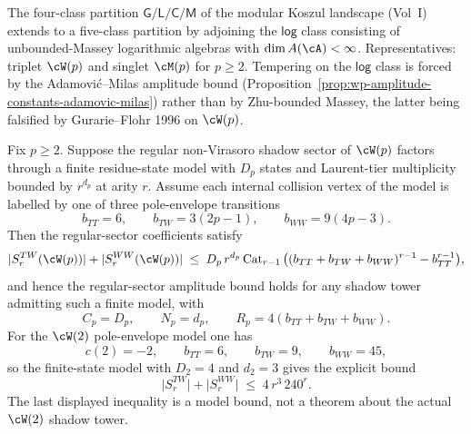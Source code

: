 \begin{corollary}
\label{cor:five-class-partition-log}
The four-class partition $\mathsf{G} / \mathsf{L} / \mathsf{C} / \mathsf{M}$
of the modular Koszul landscape (Vol~I) extends to a five-class
partition by adjoining the $\mathsf{log}$ class consisting of
unbounded-Massey logarithmic algebras with
$\dim A(\cA) < \infty$. Representatives: triplet $\cW(p)$ and
singlet $\cM(p)$ for $p \ge 2$. Tempering on the $\mathsf{log}$ class
is forced by the Adamovi\'c--Milas amplitude bound
\textup{(}Proposition~\ref{prop:wp-amplitude-constants-adamovic-milas}\textup{)}
rather than by Zhu-bounded Massey, the latter being falsified by
Gurarie--Flohr 1996 on $\cW(p)$.
\end{corollary}

\begin{proposition}
\label{prop:wp-finite-pole-envelope-reduction}
Fix $p \ge 2$. Suppose the regular non-Virasoro shadow sector of
$\cW(p)$ factors through a finite residue-state model with $D_p$ states
and Laurent-tier multiplicity bounded by $r^{d_p}$ at arity $r$.
Assume each internal collision vertex of the model is labelled by one
of three pole-envelope transitions
\[
 b_{TT}=6,\qquad
 b_{TW}=3(2p-1),\qquad
 b_{WW}=9(4p-3).
\]
Then the regular-sector coefficients satisfy
\[
 \lvert S_r^{TW}(\cW(p))\rvert+
 \lvert S_r^{WW}(\cW(p))\rvert
 \;\le\;
 D_p\, r^{d_p}\,
 \mathrm{Cat}_{r-1}\,
 \bigl((b_{TT}+b_{TW}+b_{WW})^{r-1}-b_{TT}^{r-1}\bigr),
\]
and hence the regular-sector amplitude bound holds for any shadow tower
admitting such a finite model, with
\[
 C_p=D_p,\qquad N_p=d_p,\qquad
 R_p=4(b_{TT}+b_{TW}+b_{WW}).
\]
For the $\cW(2)$ pole-envelope model one has
\[
 c(2)=-2,\qquad b_{TT}=6,\qquad b_{TW}=9,\qquad b_{WW}=45,
\]
so the finite-state model with $D_2=4$ and $d_2=3$ gives the explicit
bound
\[
 \lvert S_r^{TW}\rvert+\lvert S_r^{WW}\rvert
 \;\le\; 4\,r^3\,240^r.
\]
The last displayed inequality is a model bound, not a theorem
about the actual $\cW(2)$ shadow tower.
\end{proposition}

